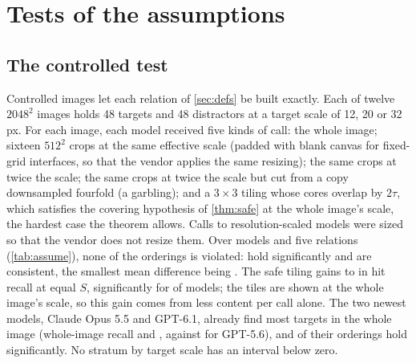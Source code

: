 \section{Tests of the assumptions}
\label{sec:assume}

\subsection{The controlled test}
\label{sec:assume-direct}

Controlled images let each relation of \cref{sec:defs} be built exactly. Each of twelve $2048^2$ images holds 48 targets and 48 distractors at a target scale of 12, 20 or 32 px. For each image, each model received five kinds of call: the whole image; sixteen $512^2$ crops at the same effective scale (padded with blank canvas for fixed-grid interfaces, so that the vendor applies the same resizing); the same crops at twice the scale; the same crops at twice the scale but cut from a copy downsampled fourfold (a garbling); and a $3 \times 3$ tiling whose cores overlap by $2\tau$, which satisfies the covering hypothesis of \cref{thm:safe} at the whole image's scale, the hardest case the theorem allows. Calls to resolution-scaled models were sized so that the vendor does not resize them. Over \XasModels{} models and five relations (\cref{tab:assume}), none of the \XasN{} orderings is violated: \XasSup{} hold significantly and \XasCons{} are consistent, the smallest mean difference being \XasMin. The safe tiling gains \XasThmMin{} to \XasThmMax{} in hit recall at equal $S$, significantly for \XasThmSup{} of \XasModels{} models; the tiles are shown at the whole image's scale, so this gain comes from less content per call alone. The two newest models, Claude Opus 5.5 and GPT-6.1, already find most targets in the whole image (whole-image recall \XasWholeRecOpusFiveFive{} and \XasWholeRecGptSixOne, against \XasWholeRecGptFiveSix{} for GPT-5.6), and \XasNewSup{} of their \XasNewN{} orderings hold significantly. No stratum by target scale has an interval below zero.

\begin{table}[t]
\centering
\footnotesize
\setlength{\tabcolsep}{4pt}
\caption{The controlled test of \cref{ass:mono}, \cref{ass:info} and \cref{thm:safe}. Each cell is the mean difference in hit recall over targets interior to both calls, with a 95\% bootstrap interval over the twelve images; bold: interval above zero. Every pair of calls satisfies the definitions of \cref{sec:defs} exactly. $^\dagger$: the two newest models.}
\label{tab:assume}
\end{table}

